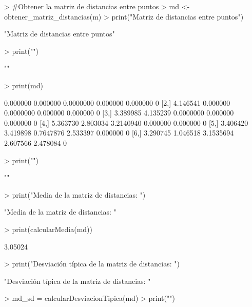 \documentclass[parskip=full]{scrartcl}
\begin{document}
\begin{Schunk}
\begin{Sinput}
> #Obtener la matriz de distancias entre puntos
> md <- obtener_matriz_distancias(m)
> print("Matriz de distancias entre puntos")
\end{Sinput}
\begin{Soutput}
[1] "Matriz de distancias entre puntos"
\end{Soutput}
\begin{Sinput}
> print("")
\end{Sinput}
\begin{Soutput}
[1] ""
\end{Soutput}
\begin{Sinput}
> print(md)
\end{Sinput}
\begin{Soutput}
         [,1]     [,2]      [,3]     [,4]     [,5] [,6]
[1,] 0.000000 0.000000 0.0000000 0.000000 0.000000    0
[2,] 4.146541 0.000000 0.0000000 0.000000 0.000000    0
[3,] 3.389985 4.135239 0.0000000 0.000000 0.000000    0
[4,] 5.363730 2.803034 3.2140940 0.000000 0.000000    0
[5,] 3.406420 3.419898 0.7647876 2.533397 0.000000    0
[6,] 3.290745 1.046518 3.1535694 2.607566 2.478084    0
\end{Soutput}
\begin{Sinput}
> print("")
\end{Sinput}
\begin{Soutput}
[1] ""
\end{Soutput}
\begin{Sinput}
> print("Media de la matriz de distancias: ")
\end{Sinput}
\begin{Soutput}
[1] "Media de la matriz de distancias: "
\end{Soutput}
\begin{Sinput}
> print(calcularMedia(md))
\end{Sinput}
\begin{Soutput}
[1] 3.05024
\end{Soutput}
\begin{Sinput}
> print("Desviación típica de la matriz de distancias: ")
\end{Sinput}
\begin{Soutput}
[1] "Desviación típica de la matriz de distancias: "
\end{Soutput}
\begin{Sinput}
> md_sd = calcularDesviacionTipica(md)
> print("")
\end{Sinput}
\begin{Soutput}

\end{Soutput}
\end{Schunk}
\end{document}
